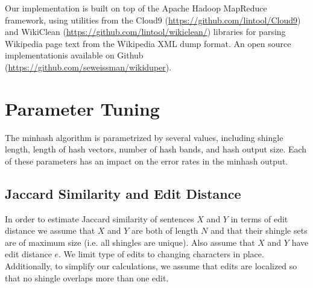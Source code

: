 \documentclass{acm_proc_article-sp}
\begin{document}
Our implementation is built on top of the Apache Hadoop MapReduce framework, using utilities from the Cloud9 (\url{https://github.com/lintool/Cloud9}) and WikiClean (\url{https://github.com/lintool/wikiclean/}) libraries for parsing Wikipedia page text from the Wikipedia XML dump format. An open source implementationis available on Github (\url{https://github.com/seweissman/wikiduper}).


\section{Parameter Tuning}

The minhash algorithm is parametrized by several values, including shingle length, length of hash vectors, number of hash bands, and hash output size. Each of these parameters has an impact on the error rates in the minhash output. 

\subsection{Jaccard Similarity and Edit Distance}


In order to estimate Jaccard similarity of sentences $X$ and $Y$ in terms of edit distance we assume that $X$ and $Y$ are both of length $N$ and that their shingle sets are of maximum size (i.e. all shingles are unique). Also assume that $X$ and $Y$ have edit distance $e$.  We limit type of edits to changing characters in place. Additionally, to simplify our calculations, we assume that edits are localized so that no shingle overlaps more than one edit.
\end{document}
